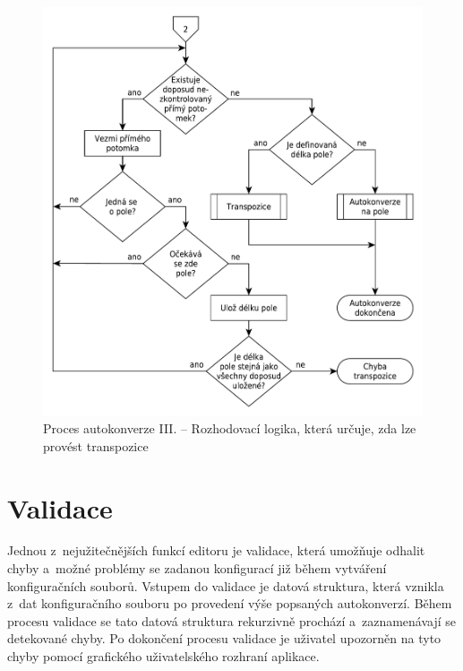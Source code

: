 \documentclass[FM,bw,DP]{tulthesis}
\begin{document}
\begin{figure}[H]
	\centering
    \includegraphics[width=\textwidth]{../img/autoconversion_process_3.pdf}
    \caption[Proces autokonverze III.]{Proces autokonverze III. -- Rozhodovací logika, která určuje, zda lze provést transpozice}
	\label{img:autoconversion_process_3}
\end{figure}


\clearpage

\section{Validace}

Jednou z~nejužitečnějších funkcí editoru je validace, která umožňuje odhalit chyby a~možné problémy se zadanou konfigurací již během vytváření konfiguračních souborů. Vstupem do validace je datová struktura, která vznikla z~dat konfiguračního souboru po provedení výše popsaných autokonverzí. Během procesu validace se tato datová struktura rekurzivně prochází a~zaznamenávají se detekované chyby. Po dokončení procesu validace je uživatel upozorněn na tyto chyby pomocí grafického uživatelského rozhraní aplikace.
\end{document}
